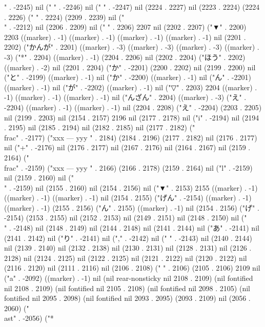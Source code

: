 {" . -2245) nil (" " . -2246) nil (" " . -2247) nil (2224 . 2227) nil (2223 . 2224) (2224 . 2226) ("   " . 2224) (2209 . 2239) nil ("\\" . -2212) nil (2206 . 2209) nil (" " . 2206) 2207 nil (2202 . 2207) ("▼" . 2200) 2203 ((marker) . -1) ((marker) . -1) ((marker) . -1) ((marker) . -1) nil (2201 . 2202) ("かんが" . 2201) ((marker) . -3) ((marker) . -3) ((marker) . -3) ((marker) . -3) ("*" . 2204) ((marker) . -1) (2204 . 2206) nil (2202 . 2204) ("ほう" . 2202) ((marker) . -2) nil (2201 . 2204) ("か" . -2201) (2200 . 2202) nil (2199 . 2200) nil ("と" . -2199) ((marker) . -1) nil ("か" . -2200) ((marker) . -1) nil ("ん" . -2201) ((marker) . -1) nil ("が" . -2202) ((marker) . -1) nil ("▽" . 2203) 2204 ((marker) . -1) ((marker) . -1) ((marker) . -1) nil ("んざん" . 2204) ((marker) . -3) ("え" . -2204) ((marker) . -1) ((marker) . -1) nil (2204 . 2208) ("え" . -2204) (2203 . 2205) nil (2199 . 2203) nil (2154 . 2157) 2196 nil (2177 . 2178) nil ("i" . -2194) nil (2194 . 2195) nil (2185 . 2194) nil (2182 . 2185) nil (2177 . 2182) ("\\frac" . -2177) ("xxx
---
yyy
" . 2184) (2184 . 2196) (2177 . 2182) nil (2176 . 2177) nil ("+" . -2176) nil (2176 . 2177) nil (2167 . 2176) nil (2164 . 2167) nil (2159 . 2164) ("\\frac" . -2159) ("xxx
---
yyy
" . 2166) (2166 . 2178) (2159 . 2164) nil ("l" . -2159) nil (2159 . 2160) nil ("\\" . -2159) nil (2155 . 2160) nil (2154 . 2156) nil ("▼" . 2153) 2155 ((marker) . -1) ((marker) . -1) ((marker) . -1) nil (2154 . 2155) ("げん" . -2154) ((marker) . -1) ((marker) . -1) (2155 . 2156) ("ん" . 2155) ((marker) . -1) nil (2154 . 2156) ("げ" . -2154) (2153 . 2155) nil (2152 . 2153) nil (2149 . 2151) nil (2148 . 2150) nil ("\\" . -2148) nil (2148 . 2149) nil (2144 . 2148) nil (2141 . 2144) nil ("あ" . -2141) nil (2141 . 2142) nil ("り" . -2141) nil ("," . -2142) nil (" " . -2143) nil (2140 . 2144) nil (2139 . 2140) nil (2132 . 2138) nil (2130 . 2131) nil (2128 . 2131) nil (2126 . 2128) nil (2124 . 2125) nil (2122 . 2125) nil (2121 . 2122) nil (2120 . 2122) nil (2116 . 2120) nil (2111 . 2116) nil (2106 . 2108) (" " . 2106) (2105 . 2106) 2109 nil ("a" . -2092) ((marker) . -1) nil (nil rear-nonsticky nil 2108 . 2109) (nil fontified nil 2108 . 2109) (nil fontified nil 2105 . 2108) (nil fontified nil 2098 . 2105) (nil fontified nil 2095 . 2098) (nil fontified nil 2093 . 2095) (2093 . 2109) nil (2056 . 2060) ("\\ast" . -2056) ("*
}
